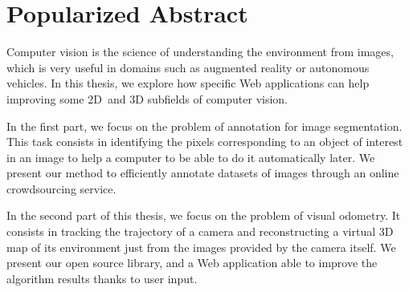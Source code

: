 \section*{Popularized Abstract}%
\label{sec:pop-abstract}

Computer vision is the science of understanding the environment from images,
which is very useful in domains such as augmented reality or autonomous vehicles.
In this thesis, we explore how specific Web applications can help improving
some 2D and 3D subfields of computer vision.

In the first part, we focus on the problem of annotation for image segmentation.
This task consists in identifying the pixels corresponding
to an object of interest in an image to help a computer to be able
to do it automatically later.
We present our method to efficiently annotate datasets of images
through an online crowdsourcing service.

In the second part of this thesis, we focus on the problem of visual odometry.
It consists in tracking the trajectory of a camera and reconstructing
a virtual 3D map of its environment just from the images provided by the camera itself.
We present our open source library, and a Web application able
to improve the algorithm results thanks to user input.

